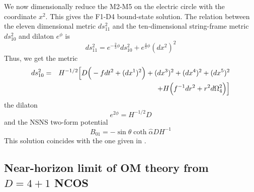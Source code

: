 \documentclass[a4paper,twoside,titlepage,12pt]{article}
\begin{document}
We now dimensionally reduce the M2-M5 on the electric circle
with the coordinate \( x^2 \).
This gives the F1-D4 bound-state solution.
The relation between the eleven dimensional metric
$ds_{11}^2$ and the ten-dimensional string-frame metric $ds_{10}^2$
and dilaton $e^{\phi}$ is
%
\begin{equation}
ds_{11}^2 = e^{-\frac{2}{3} \phi} ds_{10}^2 + e^{\frac{4}{3}\phi} (dx^2)^2
\end{equation}
%
Thus, we get the metric
%
\begin{eqnarray}
\label{F1D4met}
ds_{10}^2 &=& H^{-1/2} \Big[ D \Big( - f dt^2 + (dx^1)^2 \Big)
+  (dx^3)^2 + (dx^4)^2 + (dx^5)^2 
\nonumber \\ && + H \Big( f^{-1} dr^2 + r^2 d\Omega_4^2 \Big) \Big]
\end{eqnarray}
%
the dilaton
%
\begin{equation}
\label{F1D4dil}
e^{2\phi} = H^{-1/2} D
\end{equation}
%
and the NSNS two-form potential
%
\begin{equation}
\label{F1D4pot}
B_{01} = - \sin \hat{\theta} \coth \hat{\alpha} D H^{-1}
\end{equation}
%
This solution coincides with the one given in \cite{Harmark:2000wv}.

\subsection{Near-horizon limit of OM theory from $D=4+1$ NCOS}
\label{secOMlimit}
\end{document}
